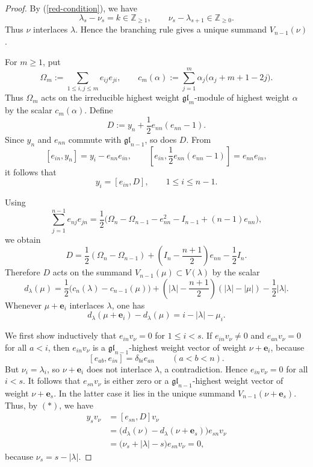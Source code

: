 \documentclass[12pt,a4paper]{amsart}
\numberwithin{equation}{section}
\begin{document}
\begin{proof}
By (\ref{red-condition}), we have
\[
 \lambda_s-\nu_s=k\in\mathbb Z_{\geq1},
 \qquad
 \nu_s-\lambda_{s+1}\in\mathbb Z_{\geq0}.
\]
 Thus $\nu$ interlaces $\lambda$. Hence the branching rule gives a unique
summand $V_{n-1}(\nu)$.

For $m\geq1$, put
\[
 \Omega_m:=\sum_{1\leq i,j\leq m}e_{ij}e_{ji},
 \qquad
 c_m(\alpha):=\sum_{j=1}^m
 \alpha_j\bigl(\alpha_j+m+1-2j\bigr).
\]
Thus $\Omega_m$ acts on the irreducible highest weight
$\mathfrak{gl}_m$-module of highest weight $\alpha$ by the scalar
$c_m(\alpha)$. Define
\[
 D:=y_n+\frac12e_{nn}(e_{nn}-1).
\]
Since $y_n$ and $e_{nn}$ commute with $\mathfrak{gl}_{n-1}$, so does $D$.
From
\[
 [e_{in},y_n]=y_i-e_{nn}e_{in},
 \qquad
 \left[e_{in},\frac12e_{nn}(e_{nn}-1)\right]=e_{nn}e_{in},
\]
it follows that
\[
 y_i=[e_{in},D],\qquad 1\leq i\leq n-1.
\]


Using
\[
 \sum_{j=1}^{n-1}e_{nj}e_{jn}
 =\frac12\bigl(\Omega_n-\Omega_{n-1}-e_{nn}^2-I_{n-1}
 +(n-1)e_{nn}\bigr),
\]
we obtain
\[
 D=\frac12(\Omega_n-\Omega_{n-1})
   +\left(I_n-\frac{n+1}{2}\right)e_{nn}-\frac12I_n.
\]
Therefore $D$ acts on the summand $V_{n-1}(\mu)\subset V(\lambda)$ by the scalar 
\[
 d_\lambda(\mu)
 =\frac12\bigl(c_n(\lambda)-c_{n-1}(\mu)\bigr)
 +\left(|\lambda|-\frac{n+1}{2}\right)(|\lambda|-|\mu|)
 -\frac12|\lambda|.
\]
Whenever $\mu+\mathbf e_i$ interlaces $\lambda$, one has
\[
 d_\lambda(\mu+\mathbf e_i)-d_\lambda(\mu)
 =i-|\lambda|-\mu_i. \tag{*}
\]

We first show inductively that $e_{in}v_\nu=0$ for $1\leq i<s$.
If $e_{in}v_\nu\neq0$ and $e_{an}v_\nu=0$ for all $a<i$, then
$e_{in}v_\nu$ is a $\mathfrak{gl}_{n-1}$-highest weight vector of weight
$\nu+\mathbf e_i$, because
\[
 [e_{ab},e_{in}]=\delta_{bi}e_{an}\qquad(a<b<n).
\]
But $\nu_i=\lambda_i$, so $\nu+\mathbf e_i$ does not interlace $\lambda$,
a contradiction. Hence $e_{in}v_\nu=0$ for all $i<s$. It follows that
$e_{sn}v_\nu$ is either zero or a $\mathfrak{gl}_{n-1}$-highest weight
vector of weight $\nu+\mathbf e_s$. In the latter case it lies in the
unique summand $V_{n-1}(\nu+\mathbf e_s)$. Thus, by $(*)$, we have
\[
 \begin{aligned}
 y_sv_\nu
 &= [e_{sn},D]v_\nu\\
 &=\bigl(d_\lambda(\nu)-d_\lambda(\nu+\mathbf e_s)\bigr)e_{sn}v_\nu\\
 &=\bigl(\nu_s+|\lambda|-s\bigr)e_{sn}v_\nu=0,
 \end{aligned}
\]
because $\nu_s=s-|\lambda|$.


\end{proof}
\end{document}
